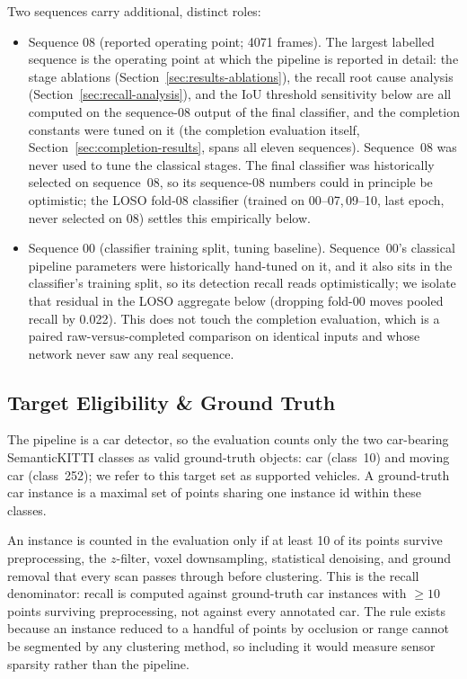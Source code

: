 Two sequences carry additional, distinct roles:
\begin{itemize}
  \item Sequence 08 (reported operating point; \num{4071} frames). The
    largest labelled sequence is the operating point at which the pipeline is
    reported in detail: the stage ablations (Section~\ref{sec:results-ablations}),
    the recall root cause analysis (Section~\ref{sec:recall-analysis}), and the
    IoU threshold sensitivity below are all computed on the sequence-08 output of the
    final classifier, and the completion constants were tuned on it (the completion
    evaluation itself, Section~\ref{sec:completion-results}, spans all eleven
    sequences). Sequence~08 was never used to tune the classical stages. The final
    classifier was historically selected on sequence~08, so its sequence-08 numbers
    could in principle be optimistic; the LOSO fold-08 classifier (trained on
    00--07,\,09--10, last epoch, never selected on 08) settles
    this empirically below.
  \item Sequence 00 (classifier training split, tuning baseline).
    Sequence~00's classical pipeline parameters were
    historically hand-tuned on it, and it also sits in the classifier's training split,
    so its detection recall reads optimistically; we isolate that residual in the
    LOSO aggregate below (dropping fold-00 moves pooled recall by \num{0.022}). This does
    not touch the completion evaluation, which is a paired raw-versus-completed comparison
    on identical inputs and whose network never saw any real sequence.
\end{itemize}

\subsection{Target Eligibility \& Ground Truth}
\label{sec:eval-targets}

The pipeline is a car detector, so the evaluation counts only the two
car-bearing SemanticKITTI classes as valid ground-truth objects:
car (class~10) and moving car (class~252); we refer to this target
set as supported vehicles. A ground-truth car instance is a
maximal set of points sharing one instance id within these classes.

An instance is counted in the evaluation only if at least 10 of its
points survive preprocessing, the $z$-filter, voxel downsampling, statistical
denoising, and ground removal that every scan passes through before clustering.
This is the recall denominator: recall is computed against ground-truth car
instances with $\geq 10$ points surviving preprocessing, not against every
annotated car. The rule exists because an instance reduced to a handful of points
by occlusion or range cannot be segmented by any clustering method, so including
it would measure sensor sparsity rather than the pipeline.

